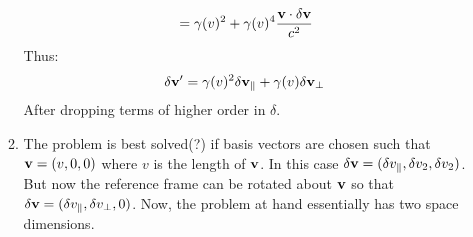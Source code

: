 \documentclass[12pt,a4]{article}
\begin{document}
\begin{enumerate}
\begin{enumerate}
\begin{align*}
                                                                       &= \gamma(v)^2 + \gamma(v)^4 \frac{{\bf v}\cdot \delta {\bf v}}{c^2}
        \end{align*}
        Thus:
        \begin{align*}
          \delta {\bf v}' &= \gamma(v)^2 \delta {\bf v}_\parallel +  \gamma(v) \delta {\bf v}_\perp
        \end{align*}
        After dropping terms of higher order in $\delta$.
      \item
        The problem is best solved(?) if basis vectors are chosen such that ${\bf v} = (v, 0, 0)$ where $v$ is the length of ${\bf v}$.
        In this case ${\bf \delta v} = ( \delta v_\parallel, \delta v_2, \delta v_2)$.
        But now the reference frame can be rotated about ${\bf v}$ so that ${\bf \delta v} = ( \delta v_\parallel, \delta v_\perp, 0)$.
        Now, the problem at hand essentially has two space dimensions.%

\end{enumerate}
\end{enumerate}
\end{document}
